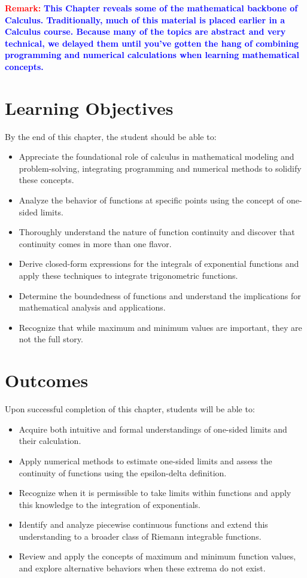 

\textcolor{red}{\bf Remark:} \textcolor{blue}{\bf This Chapter reveals some of the mathematical backbone of Calculus. Traditionally, much of this material is placed earlier in a Calculus course. Because many of the topics are abstract and very technical, we delayed them until you've gotten the hang of combining programming and numerical calculations when learning mathematical concepts.}

\section*{Learning Objectives}By the end of this chapter, the student should be able to:
\begin{itemize}
\item Appreciate the foundational role of calculus in mathematical modeling and problem-solving, integrating programming and numerical methods to solidify these concepts.
\item Analyze the behavior of functions at specific points using the concept of one-sided limits.
\item Thoroughly understand the nature of function continuity and discover that continuity comes in more than one flavor.
\item Derive closed-form expressions for the integrals of exponential functions and apply these techniques to integrate trigonometric functions.
\item Determine the boundedness of functions and understand the implications for mathematical analysis and applications.
\item Recognize that while maximum and minimum values are important, they are not the full story.
\end{itemize}

\section*{Outcomes}
Upon successful completion of this chapter, students will be able to:
\begin{itemize}
\item Acquire both intuitive and formal understandings of one-sided limits and their calculation.
\item Apply numerical methods to estimate one-sided limits and assess the continuity of functions using the epsilon-delta definition.
\item Recognize when it is permissible to take limits within functions and apply this knowledge to the integration of exponentials.
\item Identify and analyze piecewise continuous functions and extend this understanding to a broader class of Riemann integrable functions.
\item Review and apply the concepts of maximum and minimum function values, and explore alternative behaviors when these extrema do not exist.
\end{itemize}

